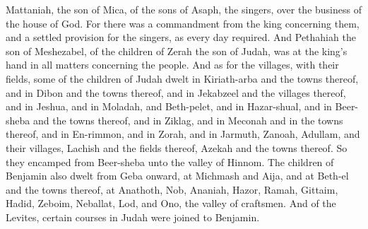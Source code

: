 Mattaniah, the son of Mica, of the sons of Asaph, the singers, over the business of the house of God. For there was a commandment from the king concerning them, and a settled provision for the singers, as every day required. And Pethahiah the son of Meshezabel, of the children of Zerah the son of Judah, was at the king’s hand in all matters concerning the people.  And as for the villages, with their fields, some of the children of Judah dwelt in Kiriath-arba and the towns thereof, and in Dibon and the towns thereof, and in Jekabzeel and the villages thereof, and in Jeshua, and in Moladah, and Beth-pelet, and in Hazar-shual, and in Beer-sheba and the towns thereof, and in Ziklag, and in Meconah and in the towns thereof, and in En-rimmon, and in Zorah, and in Jarmuth, Zanoah, Adullam, and their villages, Lachish and the fields thereof, Azekah and the towns thereof. So they encamped from Beer-sheba unto the valley of Hinnom. The children of Benjamin also dwelt from Geba onward, at Michmash and Aija, and at Beth-el and the towns thereof, at Anathoth, Nob, Ananiah, Hazor, Ramah, Gittaim, Hadid, Zeboim, Neballat, Lod, and Ono, the valley of craftsmen. And of the Levites, certain courses in Judah were joined to Benjamin. 

